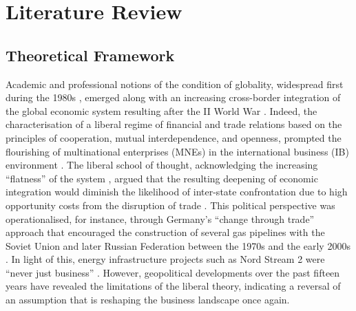 \documentclass[12pt,a4paper]{article}
\begin{document}
\section{Literature Review}
\label{sec:lit}

\subsection{Theoretical Framework}

Academic and professional notions of the condition of globality, widespread first during the 1980s \citep{Robertson1983}, emerged along with an increasing cross-border integration of the global economic system resulting after the II World War \citep{hover2025}. Indeed, the characterisation of a liberal regime of financial and trade relations based on the principles of cooperation, mutual interdependence, and openness, prompted the flourishing of multinational enterprises (MNEs) in the international business (IB) environment \citep{petricevic2019, lessard2016}. The liberal school of thought, acknowledging the increasing ``flatness'' of the system \citep{friedman2005, rugman2008}, argued that the resulting deepening of economic integration would diminish the likelihood of inter-state confrontation due to high opportunity costs from the disruption of trade \citep{mansfield2021, choi2021, gartzke2003, goldsmith2013}. This political perspective was operationalised, for instance, through Germany's ``change through trade'' approach that encouraged the construction of several gas pipelines with the Soviet Union and later Russian Federation between the 1970s and the early 2000s \citep{blumenau2022, wood2024}. In light of this, energy infrastructure projects such as Nord Stream 2 were ``never just business'' \citep{schmidt-felzmann2016}. However, geopolitical developments over the past fifteen years have revealed the limitations of the liberal theory, indicating a reversal of an assumption that is reshaping the business landscape once again.
\end{document}
